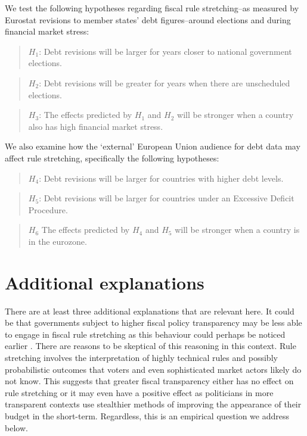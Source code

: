 \documentclass[]{article}
\begin{document}
We test the following hypotheses regarding fiscal rule stretching--as measured by Eurostat revisions to member states' debt figures--around elections and during financial market stress:

\begin{quote}
    $H_{1}$: Debt revisions will be larger for years closer to national government elections.
\end{quote}

\begin{quote}
    $H_{2}$: Debt revisions will be greater for years when there are unscheduled elections.
\end{quote}

\begin{quote}
    $H_{3}$: The effects predicted by $H_{1}$ and $H_{2}$ will be stronger when a country also has high financial market stress.
\end{quote}

We also examine how the `external' European Union audience for debt data may affect rule stretching, specifically the following hypotheses:

\begin{quote}
    $H_{4}$: Debt revisions will be larger for countries with higher debt levels.
\end{quote}

\begin{quote}
    $H_{5}$: Debt revisions will be larger for countries under an Excessive Deficit Procedure.
\end{quote}

\begin{quote}
	$H_{6}$ The effects predicted by $H_{4}$ and $H_{5}$ will be stronger when a country is in the eurozone.
\end{quote}

\section{Additional explanations}

There are at least three additional explanations that are relevant here. It could be that governments subject to higher fiscal policy transparency may be less able to engage in fiscal rule stretching as this behaviour could perhaps be noticed earlier \citep[e.g.][]{Alt2014}. There are reasons to be skeptical of this reasoning in this context. Rule stretching involves the interpretation of highly technical rules and possibly probabilistic outcomes that voters and even sophisticated market actors likely do not know. This suggests that greater fiscal transparency either has no effect on rule stretching or it may even have a positive effect as politicians in more transparent contexts use stealthier methods of improving the appearance of their budget in the short-term. Regardless, this is an empirical question we address below.
\end{document}
